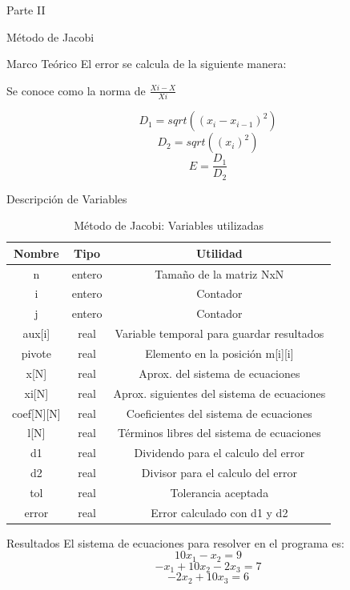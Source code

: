 \documentclass[legalpaper, 12pt]{article}
\begin{document}
\begin{section}{Parte II}
\begin{subsection}{Método de Jacobi}
\begin{subsubsection}{Marco Teórico}
        El error se calcula de la siguiente manera:
        
        Se conoce como la norma de $\frac{Xi - X}{Xi}$

        \[D_1 = sqrt((x_i-x_{i-1})^2)\]
        \[D_2 = sqrt((x_i)^2)\]
        \[E = \frac{D_1}{D_2}\]

      \end{subsubsection}
      \begin{subsubsection}{Descripción de Variables}
        \begin{table}[h]
          \centering
          \begin{tabular}{|c c c|}
            \hline
            Nombre & Tipo & Utilidad\\
            \hline\hline
            n & entero & Tamaño de la matriz NxN\\
            i & entero & Contador \\
            j & entero & Contador \\
            aux[i] & real & Variable temporal para guardar resultados\\
            pivote & real & Elemento en la posición m[i][i] \\
            x[N] & real & Aprox. del sistema de ecuaciones \\
            xi[N] & real & Aprox. siguientes del sistema de ecuaciones \\
            coef[N][N] & real & Coeficientes del sistema de ecuaciones \\
            l[N] & real & Términos libres del sistema de ecuaciones \\
            d1 & real & Dividendo para el calculo del error\\
            d2 & real & Divisor para el calculo del error\\
            tol & real & Tolerancia aceptada\\
            error & real & Error calculado con d1 y d2\\
            \hline
          \end{tabular}
          \caption{Método de Jacobi: Variables utilizadas}
        \end{table}
      \end{subsubsection}
      \newpage
      \begin{subsubsection}{Resultados}
        El sistema de ecuaciones para resolver en el programa es:
        \[10x_1-x_2=9\]
        \[-x_1+10x_2-2x_3=7\]
        \[-2x_2+10x_3=6\]


\end{subsubsection}
\end{subsection}
\end{section}
\end{document}
